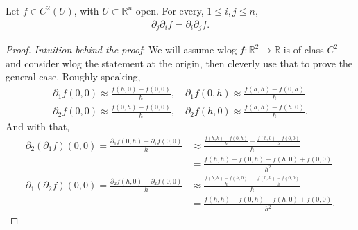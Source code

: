 \begin{theorem}[Schwarz]\label{thm:schwarz}
	Let $f \in C^{2}(U)$, with $U \subset \mathbb{R}^{n}$ open. For every, $1 \leq i, j  \leq n$,
	\begin{align*}
		\partial_{j} \partial_{i} f = \partial_{i} \partial_{j} f.
	\end{align*}
\end{theorem}
\begin{proof}
	\textit{Intuition behind the proof}: We will assume wlog $f: \mathbb{R}^{2} \to \mathbb{R}$ is of class $C^{2}$ and consider wlog the statement at the origin, then cleverly use that to prove the general case. Roughly speaking,
	\begin{align*}
		\partial_{1} f(0,0) \approx \frac{f(h, 0) - f(0,0)}{h}, \quad \partial_{1} f (0,h) \approx  \frac{f(h,h) - f(0,h)}{h} \\
		\partial_{2} f(0,0) \approx \frac{f(0,h) - f(0,0)}{h}, \quad \partial_{2}f(h,0) \approx \frac{f(h,h) - f(h,0)}{h}.
	\end{align*}
	And with that,
	\begin{align*}
		\partial_{2}(\partial_{1} f)(0,0) = \frac{\partial_{1}f(0,h) - \partial_{1} f(0,0)}{h} &\approx \frac{\frac{f(h,h) - f(0,h)}{h} - \frac{f(h,0) - f(0,0)}{h}}{h} \\ &= \frac{f(h,h) - f(0,h) - f(h,0) + f(0,0)}{h^{2}} \\
		\partial_{1}(\partial_{2} f)(0,0) = \frac{\partial_{2}f(h,0) - \partial_{2} f(0,0)}{h} &\approx \frac{\frac{f(h,h) - f(h,0)}{h} - \frac{f(0,h) - f(0,0)}{h}}{h} \\  &= \frac{f(h,h) - f(0,h) - f(h,0) + f(0,0)}{h^{2}}.
	\end{align*}


\end{proof}
